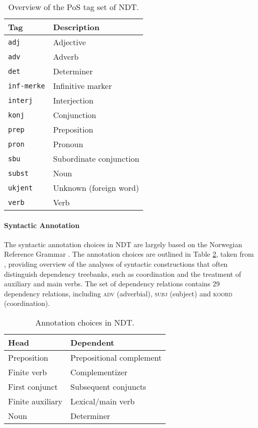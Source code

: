 \documentclass[11pt,a4paper]{article}
\begin{document}
\begin{table}
    \centering
    \begin{tabular}{@{}ll@{}}
        \toprule
        \textbf{Tag} & \textbf{Description} \\
        \midrule
        \texttt{adj} & Adjective \\
        \texttt{adv} & Adverb \\
        \texttt{det} & Determiner\\
        \texttt{inf-merke} & Infinitive marker \\
        \texttt{interj} & Interjection \\
        \texttt{konj} & Conjunction \\
        \texttt{prep} & Preposition \\
        \texttt{pron} & Pronoun \\
        \texttt{sbu} & Subordinate conjunction \\
        \texttt{subst} & Noun \\
        \texttt{ukjent} & Unknown (foreign word) \\
        \texttt{verb} & Verb \\
        \bottomrule
    \end{tabular}
    \caption{Overview of the PoS tag set of NDT.}
    \label{ndttagest}
\end{table}

\paragraph{Syntactic Annotation}
The syntactic annotation choices in NDT are largely based on the Norwegian
Reference Grammar \cite{Faa:Lie:Van:97}. The annotation choices are outlined in
Table \ref{ndtannotation}, taken from , providing
overview of the analyses of syntactic constructions that often distinguish
dependency treebanks, such as coordination and the treatment of auxiliary and
main verbs. The set of dependency relations contains 29 dependency relations,
including \textsc{adv} (adverbial), \textsc{subj} (subject) and \textsc{koord}
(coordination).

\begin{table} \centering
    \begin{tabular}{@{}ll@{}}
        \toprule
        \textbf{Head} & \textbf{Dependent} \\
        \midrule
        Preposition & Prepositional complement \\
        Finite verb & Complementizer \\
        First conjunct & Subsequent conjuncts \\
        Finite auxiliary & Lexical/main verb \\
        Noun & Determiner \\
        \bottomrule
    \end{tabular}
    \caption{Annotation choices in NDT.}
    \label{ndtannotation}
\end{table}
\end{document}
